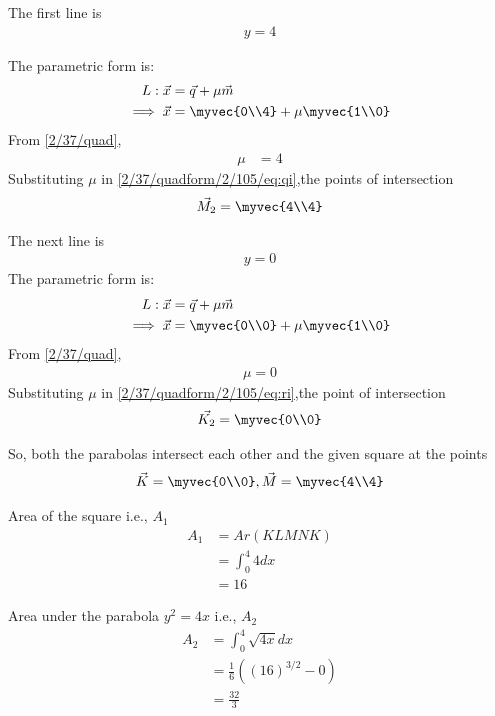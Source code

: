 The first line is
\begin{align} 
y=4
\end{align}

 The parametric form is:
\begin{align} 
L: \vec{x}&=\vec{q}+\mu\vec{m}
\\
\implies \vec{x}&=\myvec{0\\4}+\mu\myvec{1\\0} \label{2/37/quadform/2/105/eq:qi}
\end{align}
From  \eqref{2/37/quad},
\begin{align}
\mu &= 4
\end{align}
Substituting $\mu$ in \eqref{2/37/quadform/2/105/eq:qi},the points of intersection
\begin{align}
 \vec{M_2}= \myvec{4\\4}
\end{align}

The next line is 
\begin{align} 
y=0
\end{align}
The parametric form is:
\begin{align} 
L: \vec{x}&=\vec{q}+\mu\vec{m}
\\
\implies \vec{x}&=\myvec{0\\0}+\mu\myvec{1\\0} \label{2/37/quadform/2/105/eq:ri}
\end{align}
From  \eqref{2/37/quad},
\begin{align}
\mu = 0
\end{align}
Substituting $\mu$ in \eqref{2/37/quadform/2/105/eq:ri},the point of intersection
\begin{align}
 \vec{K_2}= \myvec{0\\0}
\end{align}

So, both the parabolas intersect each other and the given square at the points 
\begin{align}
 \vec{K}= \myvec{0\\0},
 \vec{M}= \myvec{4\\4}
\end{align}


Area of the square i.e., $A_1$ 
\begin{align}
    A_1 &= Ar(KLMNK)\\
    &= \int_0^4 4dx\\
    &= 16
\end{align}

Area under the parabola $y^2 = 4x$ i.e., $A_2$
\begin{align}
    A_2 &= \int_0^4 \sqrt{4x} dx\\
   &= \frac{1}{6}((16)^{3/2} - 0)\\
   &= \frac{32}{3}
\end{align}

